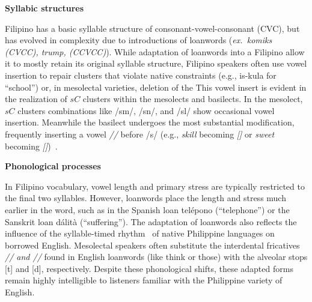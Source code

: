 \textbf{Syllabic structures}

Filipino has a basic syllable structure of consonant-vowel-consonant (CVC), but has 
evolved in complexity due to introductions of loanwords (\textit{ex.~komiks (CVCC), trump, (CCVCC)}).
While adaptation of loanwords into a Filipino allow it to mostly retain its original syllable 
structure, Filipino speakers often use vowel insertion to repair clusters that violate 
native constraints (e.g., is-kula for ``school'') or, in mesolectal varieties, deletion of the 
This vowel insert is evident in the realization of $sC$ clusters within the mesolects and basilects. 
In the mesolect, $sC$ clusters combinations like 
/sm/, /sn/, and /sl/ show occasional vowel insertion. Meanwhile the basilect undergoes the most substantial 
modification, frequently inserting a vowel \textit{//} before /s/ (e.g., 
\textit{skill} becoming \textit{[]} or \textit{sweet} 
becoming \textit{[]})~\cite{magpale_segmental_2024,magpale_hong_2024_sc}.

\textbf{Phonological processes}

In Filipino vocabulary, vowel length and primary stress are typically restricted to the 
final two syllables. However, loanwords place the length and stress much earlier in the word, 
such as in the Spanish loan telépono (``telephone'') or the Sanskrit loan dálità (``suffering''). 
The adaptation of loanwords also reflects the influence of the syllable-timed rhythm~\cite{dayag2007} 
of native Philippine languages on borrowed English. Mesolectal speakers often substitute the interdental 
fricatives \textit{// and //} found in English loanwords (like think or those) with the 
alveolar stops [t] and [d], respectively. Despite these phonological shifts, these adapted forms remain highly 
intelligible to listeners familiar with the Philippine variety of English.